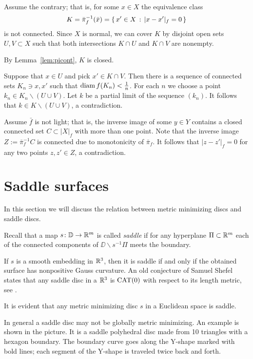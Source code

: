 \documentclass{article}
\begin{document}
Assume the contrary;
that is, for some $x\in X$ the equivalence class 
\[K=\bar\pi_f^{-1}(\bar x)=\{\,{x'\in X}\,:\,{|x-x'|_f=0}\,\}\]
is not connected. Since $X$ is normal, we
can cover $K$ by disjoint open sets $U,V\subset X$ such that both intersections
$K\cap U$ and $K\cap V$ are nonempty.

By Lemma~\ref{lem:picont}, $K$ is closed.

Suppose that $x\in U$ and pick $x'\in K\cap V$.
Then there is a sequence of connected sets $K_n\ni x,x'$ such that $\mathop{\rm diam}\nolimits f(K_n)<\tfrac1n$.
For each $n$ we choose a point $k_n\in K_n\backslash (U\cup V)$.
Let $k$ be a partial limit of the sequence $(k_n)$.
It follows that $k\in K\backslash (U\cup V)$, a contradiction. 

Assume $\bar f$ is not light;
that is, the inverse image of some $y\in Y$ contains a closed connected set $C\subset |X|_f$ with more than one point.  
Note that the inverse image $Z:=\bar\pi_f^{-1}C$ is connected due to monotonicity of $\bar\pi_f$. 
It follows that $|z-z'|_f=0$ for any two points $z,z'\in Z$, a contradiction.
\qeds










\section{Saddle surfaces}\label{sec:smooth}

In this section we will discuss the relation between metric minimizing discs and saddle discs.

Recall that a map $s\colon\mathbb{D}\to \mathbb{R}^m$ is called \emph{saddle} if for any hyperplane $\Pi\subset\mathbb{R}^m$ each of the connected components of $\DD\backslash s^{-1}\Pi$ meets the boundary.

If $s$ is a smooth embedding in $\mathbb{R}^3$, then it is saddle if and only if the  obtained surface has nonpositive Gauss curvature. 
An old conjecture of Samuel Shefel states that any saddle disc in a $\mathbb{R}^3$ is $\mathop{\rm CAT}\nolimits(0)$ with respect to its length metric, see \cite{shefel-3D}.

It is evident that any metric minimizing disc $s$ in a Euclidean space is saddle.

In general a saddle disc may not be globally metric minimizing.
An example is shown in the picture.
It is a saddle polyhedral disc made from 10 triangles
with a hexagon boundary.
The boundary curve goes along the Y-shape marked with bold lines;
each segment of the Y-shape is traveled twice back and forth.
\end{document}
